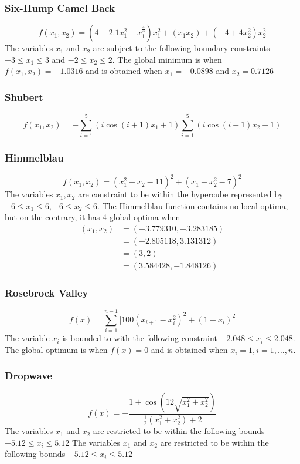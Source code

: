 \subsubsection{Six-Hump Camel Back}
\begin{equation}
	f(x_1,x_2) = (4 - 2.1x_1^2 + x_1^{\frac{4}{3}})x_1^2 + (x_1x_2) + (-4 + 4x_2^2)x_2^2
\end{equation}
The variables $x_1$ and $x_2$ are subject to the following boundary constraints $-3 \leq x_1 \leq 3$ and $-2 \leq x_2 \leq 2$. The global minimum is when $f(x_1,x_2) = -1.0316$ and is obtained when $x_1 = -0.0898$ and $x_2 = 0.7126$
\subsubsection{Shubert}
\begin{equation}
	f(x_1,x_2) = -\sum_{i = 1}^5 (i\cos{(i +1)x_1 + 1})\sum_{i=1}^5 (i\cos{(i+1)x_2 + 1})
\end{equation}
\subsubsection{Himmelblau}
\begin{equation}
	f(x_1,x_2) = (x_1^2 + x_2 - 11)^2 + (x_1 + x_2^2 - 7)^2
\end{equation}
The variables $x_1,x_2$ are constraint to be within the hypercube represented by $-6 \leq x_1 \leq 6, -6 \leq x_2 \leq 6$. The Himmelblau function contains no local optima, but on the contrary, it has 4 global optima when 
\begin{align}
(x_1,x_2) &= (-3.779310,-3.283185)\nonumber\\
		  &= (-2.805118,3.131312)\nonumber\\
		  &= (3,2)\nonumber\\
		  &= (3.584428,-1.848126)\nonumber
\end{align}
\subsubsection{Rosebrock Valley}
\begin{equation}
	f(x) = \sum_{i=1}^{n-1}[100(x_{i+1} - x_i^2)^2 + (1-x_i)^2
\end{equation}
The variable $x_i$ is bounded to with the following constraint $ -2.048 \leq x_i \leq 2.048 $. The global optimum is when $f(x) = 0$ and is obtained when $x_i = 1, i = 1,\ldots,n$.
\subsubsection{Dropwave}
\begin{equation}
	f(x) = -\frac{1 + \cos{(12\sqrt{x_1^2 + x_2^2})}}{\frac{1}{2}(x_1^2 + x_2^2) + 2}
\end{equation}
The variables $x_1$ and $x_2$ are restricted to be within the following bounds $-5.12 \leq x_i \leq 5.12$
The variables $x_1$ and $x_2$ are restricted to be within the following bounds $-5.12 \leq x_i \leq 5.12$
